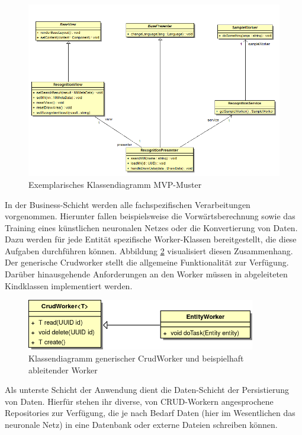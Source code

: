\begin{figure}[H]
	\centering
	\includegraphics[width=1\textwidth]{Abbildungen/UML/daniel/Klassendiagramm-MVP.png}
	\caption{Exemplarisches Klassendiagramm MVP-Muster}
	\label{mvp-exemplarisch}
\end{figure}


In der Business-Schicht werden alle fachspezifischen Verarbeitungen vorgenommen. Hierunter fallen beispielsweise die Vorwärtsberechnung sowie das Training eines künstlichen neuronalen Netzes oder die Konvertierung von Daten. Dazu werden für jede Entität spezifische Worker-Klassen bereitgestellt, die diese Aufgaben durchführen können. Abbildung \ref{CrudMin} visualisiert diesen Zusammenhang. Der generische Crudworker stellt die allgemeine Funktionalität zur Verfügung. Darüber hinausgehende Anforderungen an den Worker müssen in abgeleiteten Kindklassen implementiert werden.

\begin{figure}[H]
\begin{center}
\includegraphics[width=10cm]{Abbildungen/UML/jan/workerClassDiagramm.png}
\caption{Klassendiagramm generischer CrudWorker und beispielhaft ableitender Worker}
\label{CrudMin}
\end{center}
\end{figure}

Als unterste Schicht der Anwendung dient die Daten-Schicht der Persistierung von Daten. Hierfür stehen ihr diverse, von CRUD-Workern angesprochene Repositories zur Verfügung, die je nach Bedarf Daten (hier im Wesentlichen das neuronale Netz) in eine Datenbank oder externe Dateien schreiben können.


